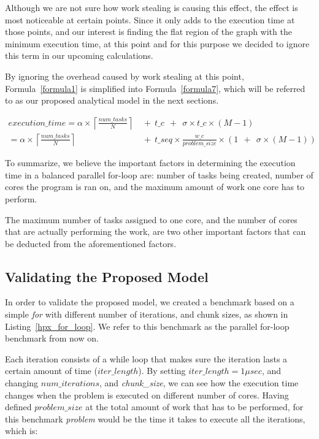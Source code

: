 Although we are not sure how work stealing is causing this effect, the effect is most  noticeable at certain points. Since it only adds to the execution time at those points, and our interest is finding the flat region of the graph with the minimum execution time, at this point and for this purpose we decided to ignore this term in our upcoming calculations. 

By ignoring the overhead caused by work stealing at this point, Formula~\ref{formula1} is simplified into Formula~\ref{formula7}, which will be referred to as our proposed analytical model in the next sections. 

\begin{equation}\label{formula7}
\begin{aligned}
execution\_time = 
\alpha\times{\left\lceil{\frac{num\_{tasks}}{N}}\right\rceil}\:\:&+\:\:t\_c\:\:+\:\:\sigma\times{t\_c}\times{(M-1)}\\
=\alpha\times{\left\lceil{\frac{num\_{tasks}}{N}}\right\rceil}\:\:&+\:\:t\_{seq}\times{\frac{w\_c}{problem\_{size}}}\times{(1\:\:+\:\:\sigma\times{(M-1)})}
\end{aligned}
\end{equation}

To summarize, we believe the important factors in determining the execution time in a balanced parallel for-loop are: number of tasks being created, number of cores the program is ran on, and the maximum amount of work one core has to perform. 

The maximum number of tasks assigned to one core, and the number of cores that are actually performing the work, are two other important factors that can be deducted from the aforementioned factors. 


\vspace{\baselineskip}
\subsection{Validating the Proposed Model}
In order to validate the proposed model, we created a benchmark based on a simple \textit{for} with different number of iterations, and chunk sizes, as shown in Listing~\ref{hpx_for_loop}. We refer to this benchmark as the parallel for-loop benchmark from now on.

Each iteration consists of a while loop that makes sure the iteration lasts a certain amount of time ($iter\_{length}$). By setting $iter\_{length}=1\mu{sec}$, and changing $num\_{iterations}$, and \emph{chunk\_{size}}, we can see how the execution time changes when the problem is executed on different number of cores. Having defined $problem\_{size}$ at the total amount of work that has to be performed, for this benchmark \textit{problem} would be the time it takes to execute all the iterations, which is:

